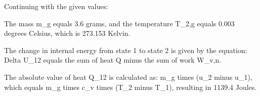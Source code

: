 Continuing with the given values:

The mass m_g equals 3.6 grams, and the temperature T_{2,g} equals 0.003 degrees Celsius, which is 273.153 Kelvin.

The change in internal energy from state 1 to state 2 is given by the equation:
Delta U_{12} equals the sum of heat Q minus the sum of work W_{v,n}.

The absolute value of heat Q_{12} is calculated as:
m_g times (u_2 minus u_1), which equals m_g times c_v times (T_2 minus T_1), resulting in 1139.4 Joules.